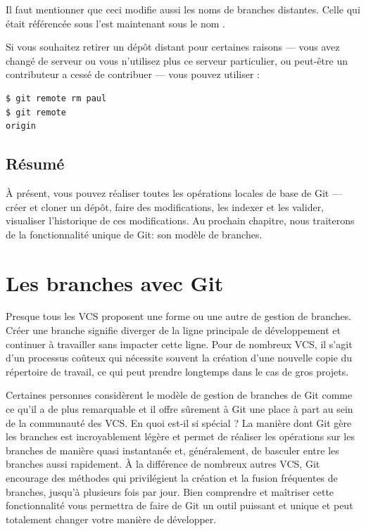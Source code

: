 Il faut mentionner que ceci modifie aussi les noms de branches distantes.
Celle qui était référencée sous  l'est maintenant sous le nom .

Si vous souhaitez retirer un dépôt distant pour certaines raisons --- vous avez changé de serveur ou vous n'utilisez plus ce serveur particulier, ou peut-être un contributeur a cessé de contribuer --- vous pouvez utiliser :
\begin{Schunk}
\begin{Verbatim}
$ git remote rm paul
$ git remote
origin
\end{Verbatim}
\end{Schunk}

\subsection{Résumé}

À présent, vous pouvez réaliser toutes les opérations locales de base de Git --- créer et cloner un dépôt, faire des modifications, les indexer et les valider, visualiser l'historique de ces modifications.
Au prochain chapitre, nous traiterons de la fonctionnalité unique de Git: son modèle de branches.


\section{Les branches avec Git}
\label{sec:git:branching}

Presque tous les VCS proposent une forme ou une autre de gestion de branches.
Créer une branche signifie diverger de la ligne principale de développement et continuer à travailler sans impacter cette ligne.
Pour de nombreux VCS, il s'agit d'un processus coûteux qui nécessite souvent la création d'une nouvelle copie du répertoire de travail, ce qui peut prendre longtemps dans le cas de gros projets.

Certaines personnes considèrent le modèle de gestion de branches de Git comme ce qu'il a de plus remarquable et il offre sûrement à Git une place à part au sein de la communauté des VCS.
En quoi est-il si spécial ?
La manière dont Git gère les branches est incroyablement légère et permet de réaliser les opérations sur les branches de manière quasi instantanée et, généralement, de basculer entre les branches aussi rapidement.
À la différence de nombreux autres VCS, Git encourage des méthodes qui privilégient la création et la fusion fréquentes de branches, jusqu'à plusieurs fois par jour.
Bien comprendre et maîtriser cette fonctionnalité vous permettra de faire de Git un outil puissant et unique et peut totalement changer votre manière de développer.

